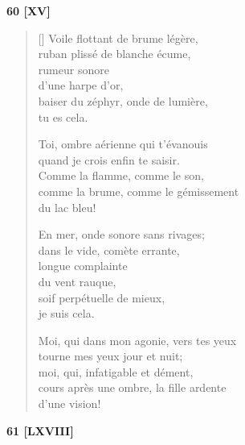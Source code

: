 \documentclass[a4paper,12pt]{book}
\begin{document}
\bigskip

\begin{center}
  \textbf{60 [XV]}
\end{center}

\settowidth{\versewidth}{Moi, qui dans mon agonie, vers tes yeux}

\begin{verse}[\versewidth]
  Voile flottant de brume légère, \\
  ruban plissé de blanche écume, \\
  rumeur sonore \\
  d'une harpe d'or, \\
  baiser du zéphyr, onde de lumière, \\
  tu es cela.

  Toi, ombre aérienne qui t'évanouis \\
  quand je crois enfin te saisir. \\
  Comme la flamme, comme le son, \\
  comme la brume, comme le gémissement \\
  du lac bleu!

  En mer, onde sonore sans rivages; \\
  dans le vide, comète errante, \\
  longue complainte \\
  du vent rauque, \\
  soif perpétuelle de mieux, \\
  je suis cela.

  Moi, qui dans mon agonie, vers tes yeux \\
  tourne mes yeux jour et nuit; \\
  moi, qui, infatigable et dément, \\
  cours après une ombre, la fille ardente \\
  d'une vision!
\end{verse}

\bigskip

\begin{center}
  \textbf{61 [LXVIII]}
\end{center}

\settowidth{\versewidth}{et, pour la première fois, je sentis en le notant}
\end{document}
